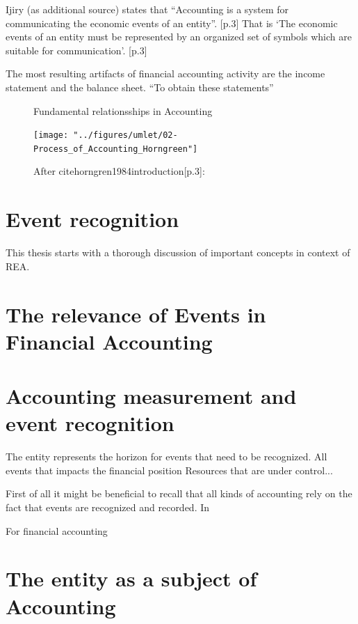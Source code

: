 Ijiry (as additional source) states that \enquote{Accounting is a system for communicating the economic events of an entity}. \cite{Ijiri1967}[p.3]
That is \enquote*{The economic events of an entity must be represented by an organized set of symbols which are suitable for communication}. \cite{Ijiri1967}[p.3]

The most resulting artifacts of financial accounting activity are the income statement and the balance sheet.
\enquote{To obtain these statements}


\begin{figure}
	\centering
	\caption{Fundamental relationsships in Accounting}
	\label{fig:accounting-fundamental-relationsships}
	\texttt{[image: "../figures/umlet/02-Process\_of\_Accounting\_Horngreen"]}
	\caption*{After cite{horngren1984introduction}[p.3]: }
\end{figure}

\section{Event recognition}





This thesis starts with a thorough discussion of important concepts in context of REA.








\section{The relevance of Events in Financial Accounting}
\section{Accounting measurement and event recognition}



The entity represents the horizon for events that need to be recognized.
All events that impacts the financial position 
Resources that are under control...

First of all it might be beneficial to recall that all kinds of accounting rely on the fact that events are recognized and recorded.
In 


For financial accounting 

\cite{horngren1984introduction} 


\section{The entity as a subject of Accounting}

